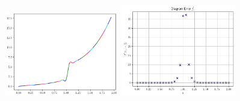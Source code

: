 \begin{figure}[H]
    \centering
    \includegraphics[width=5cm]{Images/figure_2/grafikS2.png}
    \includegraphics[width=5cm]{Images/figure_2/plotS2.png}
\end{figure}

